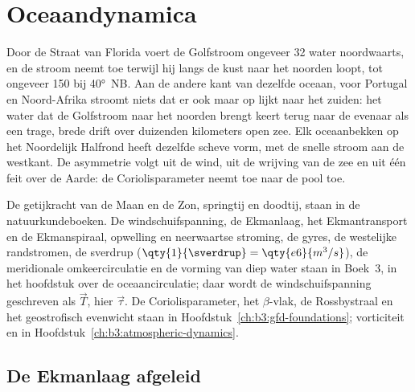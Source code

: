 \chapter{Oceaandynamica}\label{ch:b3:ocean-dynamics}

Door de Straat van Florida voert de Golfstroom ongeveer
\qty{32}{\sverdrup} water noordwaarts, en de stroom neemt toe terwijl hij
langs de kust naar het noorden loopt, tot ongeveer \qty{150}{\sverdrup} bij \ang{40}~NB. Aan de andere kant van dezelfde oceaan, voor Portugal en
Noord-Afrika stroomt niets dat er ook maar op lijkt naar het zuiden: het water dat de Golfstroom
naar het noorden brengt keert terug naar de evenaar als een trage, brede drift over duizenden
kilometers open zee. Elk oceaanbekken op het Noordelijk Halfrond heeft
dezelfde scheve vorm, met de snelle stroom aan de westkant. De
asymmetrie volgt uit de wind, uit de wrijving van de zee en uit één
feit over de Aarde: de Coriolisparameter neemt toe naar de pool toe.

\begin{recall}
De getijkracht van de Maan en de Zon, springtij en doodtij, staan in de
natuurkundeboeken. De windschuifspanning, de Ekmanlaag, het Ekmantransport en
de Ekmanspiraal, opwelling en neerwaartse stroming, de gyres, de westelijke
randstromen, de sverdrup ($\qty{1}{\sverdrup} =
\qty{e6}{m^3/s}$), de meridionale omkeercirculatie en de
vorming van diep water staan in Boek~3, in het hoofdstuk over de
oceaancirculatie; daar wordt de windschuifspanning geschreven als $\vec T$, hier
$\vec\tau$. De Coriolisparameter, het $\beta$-vlak, de Rossbystraal en
het geostrofisch evenwicht staan in Hoofdstuk~\ref{ch:b3:gfd-foundations};
vorticiteit en  in Hoofdstuk~\ref{ch:b3:atmospheric-dynamics}.
\end{recall}

\section{De Ekmanlaag afgeleid}\label{sec:b3:ocean-dynamics:ekman}

